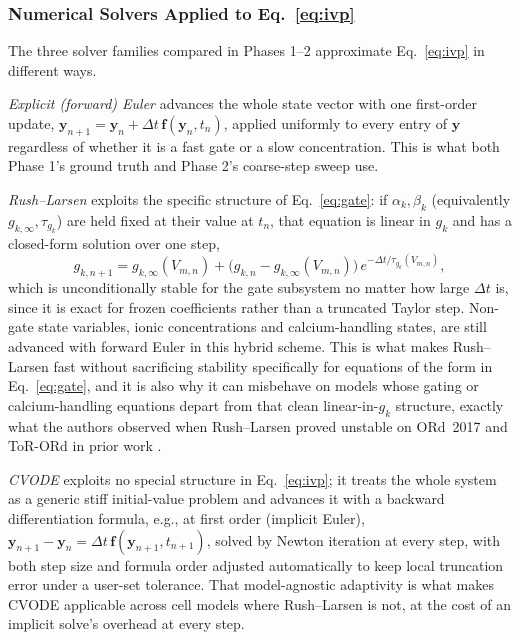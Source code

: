 \documentclass[journal]{IEEEtran}
\begin{document}
\subsubsection{Numerical Solvers Applied to Eq.~\eqref{eq:ivp}}

The three solver families compared in Phases 1--2 approximate Eq.~\eqref{eq:ivp} in different ways.

\emph{Explicit (forward) Euler} advances the whole state vector with one first-order update, $\mathbf{y}_{n+1} = \mathbf{y}_n + \Delta t\,\mathbf{f}(\mathbf{y}_n, t_n)$, applied uniformly to every entry of $\mathbf{y}$ regardless of whether it is a fast gate or a slow concentration. This is what both Phase 1's ground truth and Phase 2's coarse-step sweep use.

\emph{Rush--Larsen} \cite{rushlarsen1978} exploits the specific structure of Eq.~\eqref{eq:gate}: if $\alpha_k,\beta_k$ (equivalently $g_{k,\infty},\tau_{g_k}$) are held fixed at their value at $t_n$, that equation is linear in $g_k$ and has a closed-form solution over one step,
\begin{equation}
g_{k,n+1} = g_{k,\infty}(V_{m,n}) + \big(g_{k,n} - g_{k,\infty}(V_{m,n})\big)\, e^{-\Delta t/\tau_{g_k}(V_{m,n})},
\label{eq:rushlarsen}
\end{equation}
which is unconditionally stable for the gate subsystem no matter how large $\Delta t$ is, since it is exact for frozen coefficients rather than a truncated Taylor step. Non-gate state variables, ionic concentrations and calcium-handling states, are still advanced with forward Euler in this hybrid scheme. This is what makes Rush--Larsen fast without sacrificing stability specifically for equations of the form in Eq.~\eqref{eq:gate}, and it is also why it can misbehave on models whose gating or calcium-handling equations depart from that clean linear-in-$g_k$ structure, exactly what the authors observed when Rush--Larsen proved unstable on ORd~2017 and ToR-ORd in prior work \cite{pramawijaya2024thesis}.

\emph{CVODE} \cite{hindmarsh2005} exploits no special structure in Eq.~\eqref{eq:ivp}; it treats the whole system as a generic stiff initial-value problem and advances it with a backward differentiation formula, e.g., at first order (implicit Euler), $\mathbf{y}_{n+1} - \mathbf{y}_n = \Delta t\,\mathbf{f}(\mathbf{y}_{n+1}, t_{n+1})$, solved by Newton iteration at every step, with both step size and formula order adjusted automatically to keep local truncation error under a user-set tolerance. That model-agnostic adaptivity is what makes CVODE applicable across cell models where Rush--Larsen is not, at the cost of an implicit solve's overhead at every step.
\end{document}
